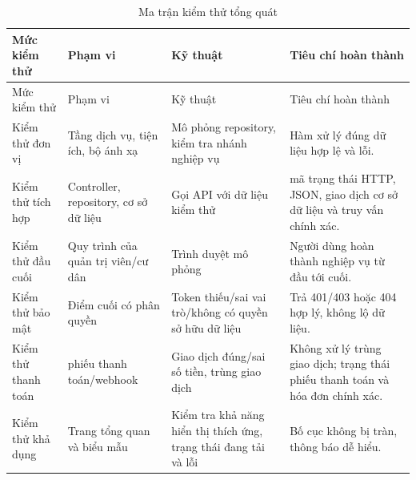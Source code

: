 ﻿\documentclass[12pt,a4paper]{report}
\begin{document}
\begin{longtable}{L{2.2cm} L{3.2cm} L{4.2cm} L{4.8cm}}
\caption{Ma trận kiểm thử tổng quát}\label{tab:test-plan}\\
\toprule
Mức kiểm thử & Phạm vi & Kỹ thuật & Tiêu chí hoàn thành \\
\midrule
\endfirsthead
\toprule Mức kiểm thử & Phạm vi & Kỹ thuật & Tiêu chí hoàn thành \\\midrule
\endhead
Kiểm thử đơn vị & Tầng dịch vụ, tiện ích, bộ ánh xạ & Mô phỏng repository, kiểm tra nhánh nghiệp vụ & Hàm xử lý đúng dữ liệu hợp lệ và lỗi. \\
Kiểm thử tích hợp & Controller, repository, cơ sở dữ liệu & Gọi API với dữ liệu kiểm thử & mã trạng thái HTTP, JSON, giao dịch cơ sở dữ liệu và truy vấn chính xác. \\
Kiểm thử đầu cuối & Quy trình của quản trị viên/cư dân & Trình duyệt mô phỏng & Người dùng hoàn thành nghiệp vụ từ đầu tới cuối. \\
Kiểm thử bảo mật & Điểm cuối có phân quyền & Token thiếu/sai vai trò/không có quyền sở hữu dữ liệu & Trả 401/403 hoặc 404 hợp lý, không lộ dữ liệu. \\
Kiểm thử thanh toán & phiếu thanh toán/webhook & Giao dịch đúng/sai số tiền, trùng giao dịch & Không xử lý trùng giao dịch; trạng thái phiếu thanh toán và hóa đơn chính xác. \\
Kiểm thử khả dụng & Trang tổng quan và biểu mẫu & Kiểm tra khả năng hiển thị thích ứng, trạng thái đang tải và lỗi & Bố cục không bị tràn, thông báo dễ hiểu. \\
\bottomrule
\end{longtable}
\end{document}
